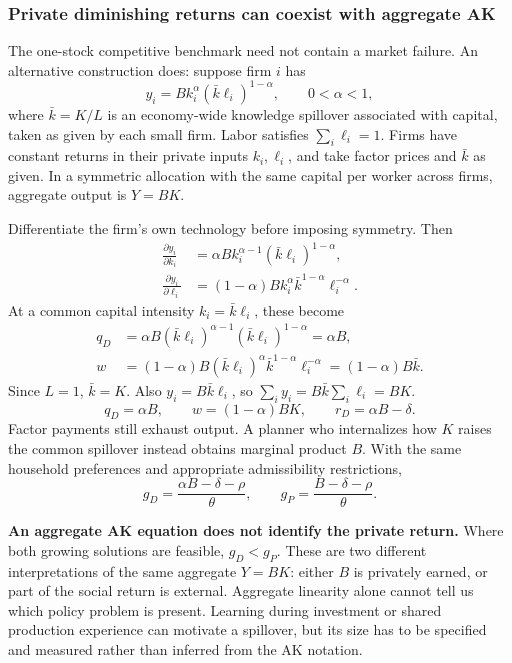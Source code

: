 \subsubsection{Private diminishing returns can coexist with aggregate AK}

The one-stock competitive benchmark need not contain a market failure. An
alternative construction does: suppose firm $i$ has
\begin{equation}
y_i=B k_i^\alpha(\bar k\ell_i)^{1-\alpha},\qquad 0<\alpha<1,
\end{equation}
where $\bar k=K/L$ is an economy-wide knowledge spillover associated with
capital, taken as given by each small firm. Labor satisfies $\sum_i\ell_i=1$.
Firms have constant returns in their private inputs $k_i,\ell_i$, and take
factor prices and $\bar k$ as given. In a symmetric allocation with the same
capital per worker across firms, aggregate output is $Y=BK$.

Differentiate the firm's own technology before imposing symmetry. Then
\begin{align}
\frac{\partial y_i}{\partial k_i}
 &=\alpha Bk_i^{\alpha-1}(\bar k\ell_i)^{1-\alpha},\\
\frac{\partial y_i}{\partial\ell_i}
 &=(1-\alpha)Bk_i^\alpha\bar k^{1-\alpha}\ell_i^{-\alpha}.
\end{align}
At a common capital intensity $k_i=\bar k\ell_i$, these become
\begin{align}
q_D&=\alpha B(\bar k\ell_i)^{\alpha-1}
                     (\bar k\ell_i)^{1-\alpha}=\alpha B,\\
w&=(1-\alpha)B(\bar k\ell_i)^\alpha
                      \bar k^{1-\alpha}\ell_i^{-\alpha}
     =(1-\alpha)B\bar k.
\end{align}
Since $L=1$, $\bar k=K$. Also $y_i=B\bar k\ell_i$, so
$\sum_i y_i=B\bar k\sum_i\ell_i=BK$.
\begin{equation}
q_D=\alpha B,\qquad w=(1-\alpha)BK,\qquad
r_D=\alpha B-\delta.
\end{equation}
Factor payments still exhaust output. A planner who internalizes how $K$
raises the common spillover instead obtains marginal product $B$. With the
same household preferences and appropriate admissibility restrictions,
\begin{equation}
g_D=\frac{\alpha B-\delta-\rho}{\theta},\qquad
 g_P=\frac{B-\delta-\rho}{\theta}.
\end{equation}
\begin{blueblock}
\textbf{An aggregate AK equation does not identify the private return.}
Where both growing solutions are feasible, $g_D<g_P$. These are two different
interpretations of the same aggregate $Y=BK$: either $B$ is privately earned,
or part of the social return is external. Aggregate linearity alone cannot
tell us which policy problem is present. Learning during investment or shared
production experience can motivate a spillover, but its size has to be
specified and measured rather than inferred from the AK notation.
\end{blueblock}

